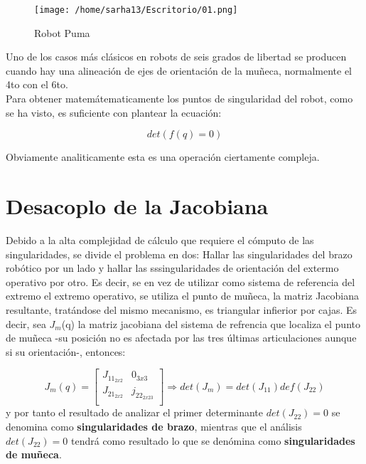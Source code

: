 \documentclass[letter,openright,12pt,spanish]{report}
\begin{document}
\begin{figure}[htp]
\centering
\texttt{[image: /home/sarha13/Escritorio/01.png]}
\caption{Robot Puma}
\label{Figura 1}
\end{figure}
Uno de los casos m\'as cl\'asicos en robots de seis grados de libertad se producen cuando hay una alineaci\'on de ejes de orientaci\'on de la mu\~neca, normalmente el 4to con el 6to.\\ 
Para obtener matem\'atematicamente los puntos de singularidad del robot, como se ha visto, es suficiente con plantear la ecuaci\'on:

\begin{displaymath}
det(f(q)=0)
\end{displaymath}

Obviamente analiticamente esta es una operaci\'on ciertamente compleja.

\section{Desacoplo de la Jacobiana}

Debido a la alta complejidad de c\'alculo que requiere el c\'omputo de las singularidades, se divide el problema en dos: Hallar las singularidades del brazo rob\'otico por un lado y hallar las sssingularidades de orientaci\'on del extermo operativo por otro. Es decir, se en vez de utilizar como sistema de referencia del extremo el extremo operativo, se utiliza el punto de mu\~neca, la matriz Jacobiana resultante, trat\'andose del mismo mecanismo, es triangular infierior por cajas. Es decir, sea $\textit{J}_m$(q) la matriz jacobiana del sistema de refrencia que localiza el punto de mu\~neca -su posici\'on no es afectada por las tres \'ultimas articulaciones aunque si su orientaci\'on-, entonces:

\begin{displaymath}
J_m(q)=[
\begin{matrix}
	J_{11_{2x2}} & 0_{3x3}\\
	J_{21_{2x2}} & j_{22_{2x23}}\\
\end{matrix}
]\Longrightarrow det (J_m)=det(J_{11})def(J_{22})
\end{displaymath} 
y por tanto el resultado de analizar el primer determinante $det(J_{22})=0$ se denomina como \textbf{singularidades de brazo}, mientras que el an\'alisis $det(J_{22})=0$ tendr\'a como resultado lo que se den\'omina como \textbf{singularidades de mu\~neca}.
\end{document}
